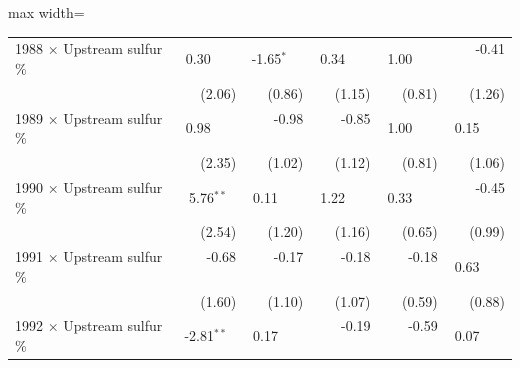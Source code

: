 \begin{table}[htbp]
{\begin{adjustbox}{max width=\linewidth}
\begin{tabular}{lrrrrr}
1988 $\times$ Upstream sulfur \% & \phantom{(}\phantom{-}0.30$^{\phantom{*}\phantom{*}\phantom{*}}$ & \phantom{(}-1.65$^{*\phantom{*}\phantom{*}}$ & \phantom{(}\phantom{-}0.34$^{\phantom{*}\phantom{*}\phantom{*}}$ & \phantom{(}\phantom{-}1.00$^{\phantom{*}\phantom{*}\phantom{*}}$ & \phantom{(}-0.41$^{\phantom{*}\phantom{*}\phantom{*}}$ \\
 & (\phantom{-}2.06)\phantom{$^{***}$} & (\phantom{-}0.86)\phantom{$^{***}$} & (\phantom{-}1.15)\phantom{$^{***}$} & (\phantom{-}0.81)\phantom{$^{***}$} & (\phantom{-}1.26)\phantom{$^{***}$} \\
1989 $\times$ Upstream sulfur \% & \phantom{(}\phantom{-}0.98$^{\phantom{*}\phantom{*}\phantom{*}}$ & \phantom{(}-0.98$^{\phantom{*}\phantom{*}\phantom{*}}$ & \phantom{(}-0.85$^{\phantom{*}\phantom{*}\phantom{*}}$ & \phantom{(}\phantom{-}1.00$^{\phantom{*}\phantom{*}\phantom{*}}$ & \phantom{(}\phantom{-}0.15$^{\phantom{*}\phantom{*}\phantom{*}}$ \\
 & (\phantom{-}2.35)\phantom{$^{***}$} & (\phantom{-}1.02)\phantom{$^{***}$} & (\phantom{-}1.12)\phantom{$^{***}$} & (\phantom{-}0.81)\phantom{$^{***}$} & (\phantom{-}1.06)\phantom{$^{***}$} \\
1990 $\times$ Upstream sulfur \% & \phantom{(}\phantom{-}5.76$^{**\phantom{*}}$ & \phantom{(}\phantom{-}0.11$^{\phantom{*}\phantom{*}\phantom{*}}$ & \phantom{(}\phantom{-}1.22$^{\phantom{*}\phantom{*}\phantom{*}}$ & \phantom{(}\phantom{-}0.33$^{\phantom{*}\phantom{*}\phantom{*}}$ & \phantom{(}-0.45$^{\phantom{*}\phantom{*}\phantom{*}}$ \\
 & (\phantom{-}2.54)\phantom{$^{***}$} & (\phantom{-}1.20)\phantom{$^{***}$} & (\phantom{-}1.16)\phantom{$^{***}$} & (\phantom{-}0.65)\phantom{$^{***}$} & (\phantom{-}0.99)\phantom{$^{***}$} \\
1991 $\times$ Upstream sulfur \% & \phantom{(}-0.68$^{\phantom{*}\phantom{*}\phantom{*}}$ & \phantom{(}-0.17$^{\phantom{*}\phantom{*}\phantom{*}}$ & \phantom{(}-0.18$^{\phantom{*}\phantom{*}\phantom{*}}$ & \phantom{(}-0.18$^{\phantom{*}\phantom{*}\phantom{*}}$ & \phantom{(}\phantom{-}0.63$^{\phantom{*}\phantom{*}\phantom{*}}$ \\
 & (\phantom{-}1.60)\phantom{$^{***}$} & (\phantom{-}1.10)\phantom{$^{***}$} & (\phantom{-}1.07)\phantom{$^{***}$} & (\phantom{-}0.59)\phantom{$^{***}$} & (\phantom{-}0.88)\phantom{$^{***}$} \\
1992 $\times$ Upstream sulfur \% & \phantom{(}-2.81$^{**\phantom{*}}$ & \phantom{(}\phantom{-}0.17$^{\phantom{*}\phantom{*}\phantom{*}}$ & \phantom{(}-0.19$^{\phantom{*}\phantom{*}\phantom{*}}$ & \phantom{(}-0.59$^{\phantom{*}\phantom{*}\phantom{*}}$ & \phantom{(}\phantom{-}0.07$^{\phantom{*}\phantom{*}\phantom{*}}$ \\

\end{tabular}
\end{adjustbox}}
\end{table}

